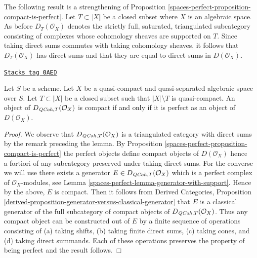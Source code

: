 The following result is a strengthening of
Proposition \ref{spaces-perfect-proposition-compact-is-perfect}.
Let $T \subset |X|$ be a closed subset where $X$ is an algebraic space.
As before $D_T(\mathcal{O}_X)$ denotes the strictly full, saturated,
triangulated subcategory consisting of complexes whose
cohomology sheaves are supported on $T$. Since taking direct
sums commutes with taking cohomology sheaves, it follows
that $D_T(\mathcal{O}_X)$ has direct sums and that they are equal
to direct sums in $D(\mathcal{O}_X)$.

\begin{lemma}
\label{spaces-perfect-lemma-compact-is-perfect-with-support}
\href{https://stacks.math.columbia.edu/tag/0AED}{\texttt{Stacks tag 0AED}}

Let $S$ be a scheme.
Let $X$ be a quasi-compact and quasi-separated algebraic space over $S$.
Let $T \subset |X|$ be a closed subset such that $|X| \setminus T$
is quasi-compact. An object of $D_{\mathit{QCoh}, T}(\mathcal{O}_X)$ is compact
if and only if it is perfect as an object of $D(\mathcal{O}_X)$.
\end{lemma}

\begin{proof}
We observe that $D_{\mathit{QCoh}, T}(\mathcal{O}_X)$ is a triangulated
category with direct sums by the remark preceding the lemma.
By Proposition \ref{spaces-perfect-proposition-compact-is-perfect}
the perfect objects define compact objects of $D(\mathcal{O}_X)$
hence a fortiori of any subcategory preserved under taking direct
sums. For the converse we will use there exists a generator
$E \in D_{\mathit{QCoh}, T}(\mathcal{O}_X)$ which is a perfect complex
of $\mathcal{O}_X$-modules, see
Lemma \ref{spaces-perfect-lemma-generator-with-support}.
Hence by the above, $E$ is compact. Then it follows from
Derived Categories, Proposition
\ref{derived-proposition-generator-versus-classical-generator}
that $E$ is a classical generator of the full subcategory
of compact objects of $D_{\mathit{QCoh}, T}(\mathcal{O}_X)$.
Thus any compact object can be constructed out of $E$ by
a finite sequence of operations consisting of
(a) taking shifts, (b) taking finite direct sums, (c) taking cones, and
(d) taking direct summands. Each of these operations preserves
the property of being perfect and the result follows.
\end{proof}

